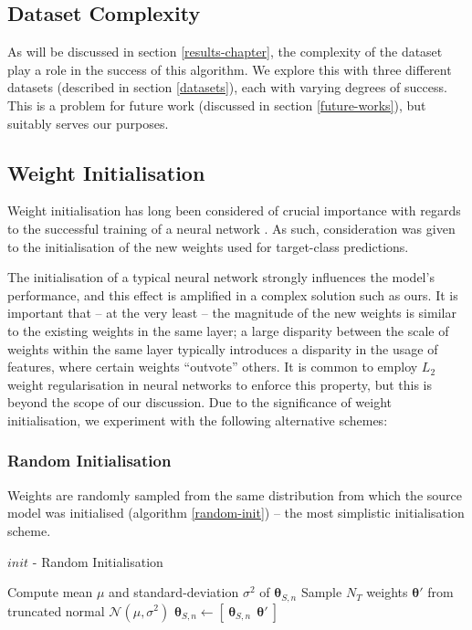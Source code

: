 \documentclass{report}
\begin{document}
\subsection{Dataset Complexity}
As will be discussed in section \ref{results-chapter}, the complexity of the dataset play a role in the success of this algorithm. We explore this with three different datasets (described in section \ref{datasets}), each with varying degrees of success. This is a problem for future work (discussed in section \ref{future-works}), but suitably serves our purposes. \par

\subsection{Weight Initialisation}
Weight initialisation has long been considered of crucial importance with regards to the successful training of a neural network \parencite{heinit}\parencite{weightinit}. As such, consideration was given to the initialisation of the new weights used for target-class predictions. \par
The initialisation of a typical neural network strongly influences the model's performance, and this effect is amplified in a complex solution such as ours. It is important that -- at the very least -- the magnitude of the new weights is similar to the existing weights in the same layer; a large disparity between the scale of weights within the same layer typically introduces a disparity in the usage of features, where certain weights ``outvote'' others. It is common to employ $L_2$ weight regularisation in neural networks to enforce this property, but this is beyond the scope of our discussion. Due to the significance of weight initialisation, we experiment with the following alternative schemes:

\subsubsection{Random Initialisation}
Weights are randomly sampled from the same distribution from which the source model was initialised (algorithm \ref{random-init}) -- the most simplistic initialisation scheme.
\begin{algorithm}[h!]
	\label{alg:random-init}
	\caption{$init$ - Random Initialisation }
	\label{random-init}
	\begin{algorithmic}[1]
		\State Compute mean $\mu$ and standard-deviation $\sigma^2$ of $\bm{\theta}_{S,n}$
		\State Sample $N_T$ weights $\bm{\theta}'$ from truncated normal $\mathcal{N}(\mu, \sigma^2)$
		\State $\bm{\theta}_{S,n} \gets [~ \bm{\theta}_{S,n}~ ~ \bm{\theta}'~ ]$
	\end{algorithmic}
\end{algorithm}
\end{document}
